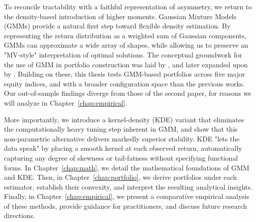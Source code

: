 To reconcile tractability with a faithful representation of asymmetry, we return to the density-based introduction of higher moments. Gaussian Mixture Models (GMMs) provide a natural first step toward flexible density estimation. By representing the return distribution as a weighted sum of Gaussian components, GMMs can approximate a wide array of shapes, while allowing us to preserve an "MV-style" interpretation of optimal solutions. The conceptual groundwork for the use of GMM in portfolio construction was laid by \cite{luxenbergPortfolioConstructionGaussian2022}, and later expanded upon by \cite{wangRobustContextualPortfolio2022}. Building on these, this thesis tests GMM-based portfolios across five major equity indices, and with a broader configuration space than the previous works. Our out-of-sample findings diverge from those of the second paper, for reasons we will analyze in Chapter~\ref{chap:empirical}.

More importantly, we introduce a kernel-density (KDE) variant that eliminates the computationally heavy tuning step inherent in GMM, and show that this non-parametric alternative delivers markedly superior stability. KDE "lets the data speak" by placing a smooth kernel at each observed return, automatically capturing any degree of skewness or tail-fatness without specifying functional forms. In Chapter~\ref{chap:math}, we detail the mathematical foundations of GMM and KDE. Then, in Chapter~\ref{chap:portfolio}, we derive portfolios under each estimator, establish their convexity, and interpret the resulting analytical insights. Finally, in Chapter~\ref{chap:empirical}, we present a comparative empirical analysis of these methods, provide guidance for practitioners, and discuss future research directions.
